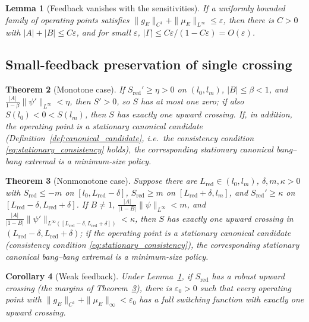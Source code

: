 \documentclass[pdflatex,sn-mathphys-num]{sn-jnl}
\theoremstyle{plain}
\newtheorem{theorem}{Theorem}[section]
\newtheorem{lemma}[theorem]{Lemma}
\newtheorem{corollary}[theorem]{Corollary}
\theoremstyle{definition}
\theoremstyle{remark}
\begin{document}
\begin{lemma}[Feedback vanishes with the sensitivities]
\label{lem:feedback_vanishes}
If a uniformly bounded family of operating points satisfies
$\|g_E\|_{C^1}+\|\mu_E\|_{L^\infty}\le\varepsilon$, then there is $C>0$ with
$|A|+|B|\le C\varepsilon$, and for small $\varepsilon$,
$|\Gamma|\le C\varepsilon/(1-C\varepsilon)=O(\varepsilon)$.
\end{lemma}

\subsection{Small-feedback preservation of single crossing}
\label{subsec:small_feedback}

\begin{theorem}[Monotone case]
\label{thm:small_feedback_monotone}
If $S_{\mathrm{red}}'\ge\eta>0$ on $(l_0,l_m)$, $|B|\le\beta<1$, and
$\frac{|A|}{1-\beta}\|\psi'\|_{L^\infty}<\eta$, then $S'>0$, so $S$ has at most one
zero; if also $S(l_0)<0<S(l_m)$, then $S$ has exactly one upward crossing. If, in
addition, the operating point is a stationary canonical candidate
(Definition~\ref{def:canonical_candidate}, i.e.\ the consistency condition
\eqref{eq:stationary_consistency} holds), the corresponding stationary canonical
bang--bang extremal is a minimum-size policy.
\end{theorem}

\begin{theorem}[Nonmonotone case]
\label{thm:small_feedback_single_crossing}
Suppose there are $L_{\mathrm{red}}\in(l_0,l_m)$, $\delta,m,\kappa>0$ with
$S_{\mathrm{red}}\le-m$ on $[l_0,L_{\mathrm{red}}-\delta]$,
$S_{\mathrm{red}}\ge m$ on $[L_{\mathrm{red}}+\delta,l_m]$, and
$S_{\mathrm{red}}'\ge\kappa$ on $[L_{\mathrm{red}}-\delta,L_{\mathrm{red}}+\delta]$.
If $B\neq1$,
$\frac{|A|}{|1-B|}\|\psi\|_{L^\infty}<m$, and
$\frac{|A|}{|1-B|}\|\psi'\|_{L^\infty([L_{\mathrm{red}}-\delta,L_{\mathrm{red}}+\delta])}<\kappa$,
then $S$ has exactly one upward crossing in
$(L_{\mathrm{red}}-\delta,L_{\mathrm{red}}+\delta)$; if the operating point is a
stationary canonical candidate (consistency condition
\eqref{eq:stationary_consistency}), the corresponding stationary canonical
bang--bang extremal is a minimum-size policy.
\end{theorem}

\begin{corollary}[Weak feedback]
\label{cor:weak_feedback}
Under Lemma~\ref{lem:feedback_vanishes}, if $S_{\mathrm{red}}$ has a robust upward
crossing (the margins of Theorem~\ref{thm:small_feedback_single_crossing}), there
is $\varepsilon_0>0$ such that every operating point with
$\|g_E\|_{C^1}+\|\mu_E\|_\infty<\varepsilon_0$ has a full switching function with
exactly one upward crossing.
\end{corollary}
\end{document}
